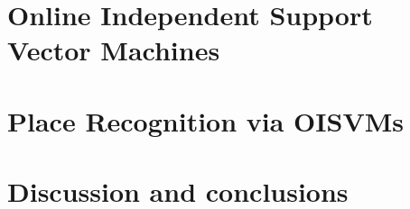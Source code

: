 \documentclass{bmvc}
\begin{document}
\section{Online Independent Support Vector Machines}
\label{sec:opt}


\section{Place Recognition via OISVMs}
\label{sec:exp}



\section{Discussion and conclusions}
\label{sec:concl}


{\small


}
\end{document}
